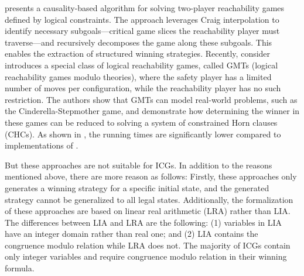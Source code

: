 \documentclass[review]{elsarticle}
\begin{document}
\citet{BaiCF2021} presents a causality-based algorithm for solving two-player reachability games defined by logical constraints. The approach leverages Craig interpolation to identify necessary subgoals—critical game slices the reachability player must traverse—and recursively decomposes the game along these subgoals. This enables the extraction of structured winning strategies.
Recently, \citet{FaeP2023} consider introduces a special class of logical reachability games, called GMTs (logical reachability games modulo theories), where the safety player has a limited number of moves per configuration, while the reachability player has no such restriction. The authors show that GMTs can model real-world problems, such as the Cinderella-Stepmother game, and demonstrate how determining the winner in these games can be reduced to solving a system of constrained Horn clauses (CHCs).
As shown in \cite{FaeP2023}, the running times are significantly lower compared to implementations of \citet{BaiCF2021}. 

But these approaches are not suitable for ICGs. In addition to the reasons mentioned above, there are more reason as follows:
Firstly, these approaches only generates a winning strategy for a specific initial state, and the generated strategy cannot be generalized to all legal states.
Additionally, the formalization of these approaches are based on linear real arithmetic (LRA) rather than LIA.
The differences between LIA and LRA are the following: (1) variables in LIA have an integer domain rather than real one; and (2) LIA contains the congruence modulo relation while LRA does not.
The majority of ICGs contain only integer variables and require congruence modulo relation in their winning formula.
\end{document}
